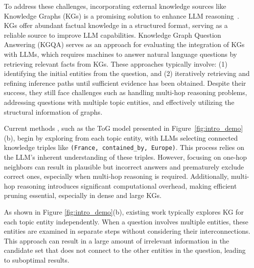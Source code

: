To address these challenges, incorporating external knowledge sources like Knowledge Graphs (KGs) is a promising solution to enhance LLM reasoning~\cite{tog1.0sun2023think, rogluo2023reasoning, pan2024unifying, luo2023chatrule}. KGs offer abundant factual knowledge in a structured format, serving as a reliable source to improve LLM capabilities.  
Knowledge Graph Question Answering (KGQA) serves as an approach for evaluating the integration of KGs with LLMs,
which requires machines to answer natural language questions by retrieving relevant facts from KGs.
These approaches typically involve: (1) identifying the initial entities from the question, and (2) iteratively retrieving and refining inference paths until sufficient evidence has been obtained. 
Despite their success, they still face challenges such as handling multi-hop reasoning problems, addressing questions with multiple topic entities, and effectively utilizing the structural information of graphs.



 Current methods \cite{guo2024knowledgenavigator,ye2021rng,tog1.0sun2023think,tog2.0ma2024think}, such as the ToG model presented in Figure~\ref{fig:intro_demo}(b), begin by exploring from each topic entity, with LLMs selecting connected knowledge triples like \texttt{(France, contained\_by, Europe)}. This process relies on the LLM's inherent understanding of these triples. However, focusing on one-hop neighbors can result in plausible but incorrect answers and prematurely exclude correct ones, especially when multi-hop reasoning is required. 
Additionally, multi-hop reasoning introduces significant computational overhead, making efficient pruning essential, especially in dense and large KGs.







 As shown in Figure \ref{fig:intro_demo}(b), existing work \cite{guo2024knowledgenavigator,ye2021rng,tog1.0sun2023think,tog2.0ma2024think} typically explores KG for each topic entity independently. When a question involves multiple entities, these entities are examined in separate steps without considering their interconnections. This approach can result in a large amount of irrelevant information in the candidate set that does not connect to the other entities in the question, leading to suboptimal results. 

